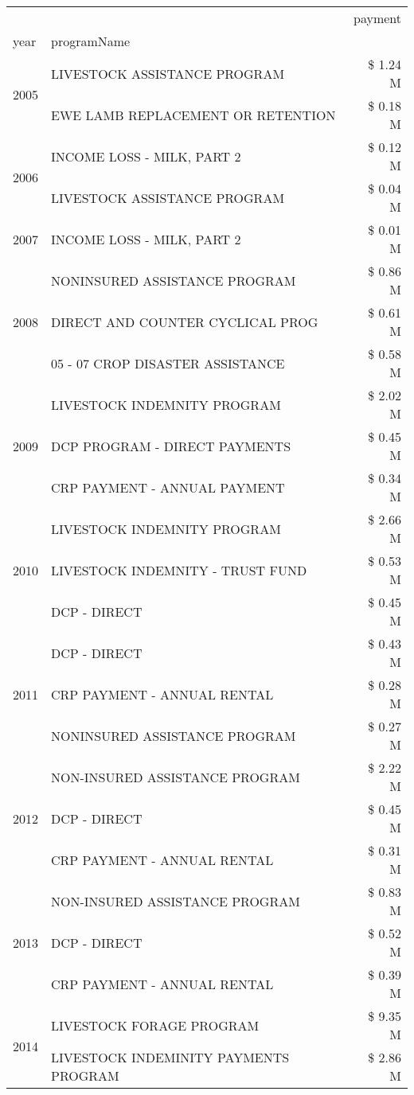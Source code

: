 \begin{tabular}{llr}
\toprule
 &  & payment \\
year & programName &  \\
\midrule
\multirow[t]{2}{*}{2005} & LIVESTOCK ASSISTANCE PROGRAM & \$ 1.24 M \\
 & EWE LAMB REPLACEMENT OR RETENTION & \$ 0.18 M \\
\cline{1-3}
\multirow[t]{2}{*}{2006} & INCOME LOSS - MILK, PART 2 & \$ 0.12 M \\
 & LIVESTOCK ASSISTANCE PROGRAM & \$ 0.04 M \\
\cline{1-3}
2007 & INCOME LOSS - MILK, PART 2 & \$ 0.01 M \\
\cline{1-3}
\multirow[t]{3}{*}{2008} & NONINSURED ASSISTANCE PROGRAM & \$ 0.86 M \\
 & DIRECT AND COUNTER CYCLICAL PROG & \$ 0.61 M \\
 & 05 - 07 CROP DISASTER ASSISTANCE & \$ 0.58 M \\
\cline{1-3}
\multirow[t]{3}{*}{2009} & LIVESTOCK INDEMNITY PROGRAM & \$ 2.02 M \\
 & DCP PROGRAM - DIRECT PAYMENTS & \$ 0.45 M \\
 & CRP PAYMENT - ANNUAL PAYMENT & \$ 0.34 M \\
\cline{1-3}
\multirow[t]{3}{*}{2010} & LIVESTOCK INDEMNITY PROGRAM & \$ 2.66 M \\
 & LIVESTOCK INDEMNITY - TRUST FUND & \$ 0.53 M \\
 & DCP - DIRECT & \$ 0.45 M \\
\cline{1-3}
\multirow[t]{3}{*}{2011} & DCP - DIRECT & \$ 0.43 M \\
 & CRP PAYMENT - ANNUAL RENTAL & \$ 0.28 M \\
 & NONINSURED ASSISTANCE PROGRAM & \$ 0.27 M \\
\cline{1-3}
\multirow[t]{3}{*}{2012} & NON-INSURED ASSISTANCE PROGRAM & \$ 2.22 M \\
 & DCP - DIRECT & \$ 0.45 M \\
 & CRP PAYMENT - ANNUAL RENTAL & \$ 0.31 M \\
\cline{1-3}
\multirow[t]{3}{*}{2013} & NON-INSURED ASSISTANCE PROGRAM & \$ 0.83 M \\
 & DCP - DIRECT & \$ 0.52 M \\
 & CRP PAYMENT - ANNUAL RENTAL & \$ 0.39 M \\
\cline{1-3}
\multirow[t]{3}{*}{2014} & LIVESTOCK FORAGE PROGRAM & \$ 9.35 M \\
 & LIVESTOCK INDEMINITY PAYMENTS PROGRAM & \$ 2.86 M \\

\end{tabular}
